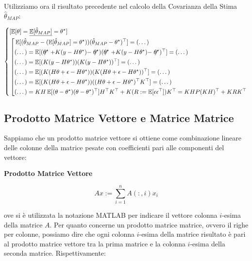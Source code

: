 Utilizziamo ora il risultato precedente nel calcolo della Covarianza della Stima $\hat{\theta}_{MAP}$:

\[
	\left\{
	\begin{aligned}
	&[\E[\theta]=\underline{\E[\hat{\theta}_{MAP}]}=\theta^\star]\\
	&\left[
	\begin{aligned}
	&\E[(\hat{\theta}_{MAP}-(\E[\hat{\theta}_{MAP}] = \theta^\star))(\hat{\theta}_{MAP} - \theta^\star)^\top] = (\dots)\\
	&(\dots) = \E[(\centernot{\theta^\star} + K(y-H\theta^\star)-\centernot{\theta^\star})(\centernot{\theta^\star}+K(y-H\theta^\star)-\centernot{\theta^\star})^\top] = (\dots)\\
	&(\dots) = \E[(K(y-H\theta^\star))(K(y-H\theta^\star))^\top] = (\dots)\\
	&(\dots) = \E[(K(H\theta+\epsilon-H\theta^\star))(K(H\theta+\epsilon-H\theta^\star))^\top] = (\dots)\\
	&(\dots) = \E[(K(H\theta+\epsilon-H\theta^\star))((H\theta+\epsilon-H\theta^\star)^\top K^\top] = (\dots)\\
	&(\dots) = KH\E[(\theta-\theta^\star)(\theta-\theta^\star)^\top]H^\top K^\top + K(R:=\E[\epsilon\epsilon^\top])K^\top = KHP(KH)^\top + KRK^\top
	\end{aligned}
	\right.
	\end{aligned}
	\right.
\]
	

\subsection{Prodotto Matrice Vettore e Matrice Matrice}

Sappiamo che un prodotto matrice vettore si ottiene come combinazione lineare delle colonne della matrice pesate con coefficienti pari alle componenti del vettore:

\begin{defn}{\textbf{Prodotto Matrice Vettore}}

\[
	Ax := \sum_{i=1}^n{A(:,i)x_i}
\]

\end{defn}

ove si è utilizzata la notazione MATLAB per indicare il vettore colonna $i$-esima della matrice $A$.
Per quanto concerne un prodotto matrice matrice, ovvero il righe per colonne, possiamo dire che ogni colonna $i$-esima della matrice risultato è pari al prodotto matrice vettore tra la prima matrice e la colonna $i$-esima della seconda matrice. Rispettivamente:

